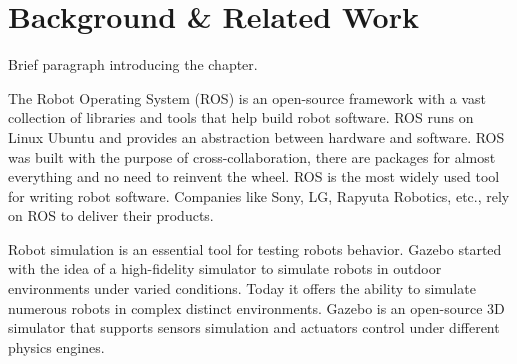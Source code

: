\chapter{Background \& Related Work}
\label{chap:background}

Brief paragraph introducing the chapter.

The Robot Operating System (ROS) is an open-source framework with a 
vast collection of libraries and tools that help build robot software. 
ROS runs on Linux Ubuntu and provides an abstraction between hardware and software.
ROS was built with the purpose of cross-collaboration, there are
packages for almost everything and no need to reinvent the wheel.
ROS is the most widely used tool for writing robot software.
Companies like Sony, LG, Rapyuta Robotics, etc., rely on ROS to deliver their products.

Robot simulation is an essential tool for testing robots behavior. 
Gazebo started with the idea of a high-fidelity simulator to simulate 
robots in outdoor environments under varied conditions.
Today it offers the ability to simulate numerous robots in complex distinct environments.
Gazebo is an open-source 3D simulator that supports sensors simulation 
and actuators control under different physics engines.

